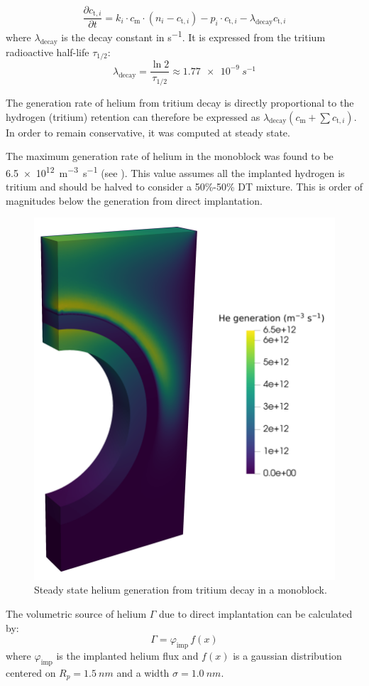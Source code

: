 \begin{equation}
    \frac{\partial c_{\mathrm{t}, i}}{\partial t}=k_i \cdot c_\mathrm{m} \cdot\left(n_{i}-c_{\mathrm{t}, i}\right)-p_i \cdot c_{\mathrm{t}, i} - \lambda_\mathrm{decay} c_{\mathrm{t}, i}
\end{equation}
where $\lambda_\mathrm{decay}$ is the decay constant in \si{s^{-1}}.
It is expressed from the tritium radioactive half-life $\tau_{1/2}$:
\begin{equation}
    \lambda_\mathrm{decay} = \frac{\ln 2}{\tau_{1/2}} \approx \SI{1.77e-9}{s^{-1}}
\end{equation}

The generation rate of helium from tritium decay is directly proportional to the hydrogen (tritium) retention can therefore be expressed as $\lambda_\mathrm{decay} (c_\mathrm{m} + \sum c_{\mathrm{t}, i})$.
In order to remain conservative, it was computed at steady state.

The maximum generation rate of helium in the \gls{monoblock} was found to be \SI{6.5e12}{m^{-3}.s^{-1}} (see ).
This value assumes all the implanted hydrogen is tritium and should be halved to consider a 50\%-50\% DT mixture.
This is order of magnitudes below the generation from direct implantation.

\begin{figure}
    \centering
    \includegraphics[width=0.5\linewidth]{Figures/Chapter5/he_generation_decay.png}
    \caption{Steady state helium generation from tritium decay in a monoblock.}
\end{figure}


The volumetric source of helium $\Gamma$ due to direct implantation can be calculated by:
\begin{equation}
    \Gamma = \varphi_\mathrm{imp} \, f(x)
\end{equation}
where $\varphi_\mathrm{imp}$ is the implanted helium flux and $f(x)$ is a gaussian distribution centered on $R_p=\SI{1.5}{nm}$ and a width $\sigma=\SI{1.0}{nm}$.

